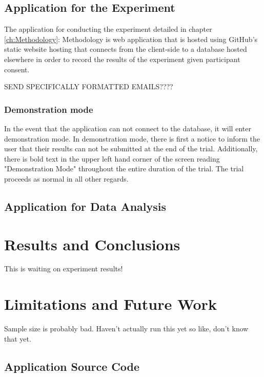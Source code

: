 \documentclass[12pt]{report}
\begin{document}
\section{Application for the Experiment}

The application for conducting the experiment detailed in chapter \ref{ch:Methodology}: Methodology is web application that is hosted using GitHub's static website hosting that connects from the client-side to a database hosted elsewhere in order to record the results of the experiment given participant consent.

SEND SPECIFICALLY FORMATTED EMAILS????

\subsection{Demonstration mode}

In the event that the application can not connect to the database, it will enter demonstration mode. In demonstration mode, there is first a notice to inform the user that their results can not be submitted at the end of the trial. Additionally, there is bold text in the upper left hand corner of the screen reading "Demonstration Mode" throughout the entire duration of the trial. The trial proceeds as normal in all other regards.

\section{Application for Data Analysis}

\chapter{Results and Conclusions}
\label{ch:Results and Conclusions}

This is waiting on experiment results!

\chapter{Limitations and Future Work}
\label{ch:Limitations and Future Work}

Sample size is probably bad. Haven't actually run this yet so like, don't know that yet.




%

\begin{appendices}

\chapter{Application Source Code}
\label{ch:App Source Code}

\end{appendices}
\end{document}
